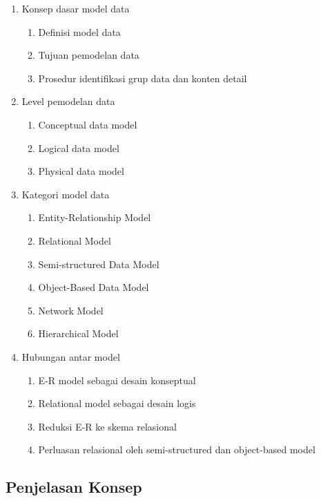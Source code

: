 \begin{enumerate}
    \item \pwajib Konsep dasar model data
    \begin{enumerate}
        \item \pwajib Definisi model data
        \item \pwajib Tujuan pemodelan data
        \item \pwajib Prosedur identifikasi grup data dan konten detail
    \end{enumerate}
    \item \pwajib Level pemodelan data
    \begin{enumerate}
        \item \pwajib Conceptual data model
        \item \pwajib Logical data model
        \item \pwajib Physical data model
    \end{enumerate}
    \item \pwajib Kategori model data
    \begin{enumerate}
        \item \pwajib Entity-Relationship Model
        \item \pwajib Relational Model
        \item \ppaham Semi-structured Data Model
        \item \ppaham Object-Based Data Model
        \item \ppaham Network Model
        \item \ppaham Hierarchical Model
    \end{enumerate}
    \item \pwajib Hubungan antar model
    \begin{enumerate}
        \item \pwajib E-R model sebagai desain konseptual
        \item \pwajib Relational model sebagai desain logis
        \item \pwajib Reduksi E-R ke skema relasional
        \item \ppaham Perluasan relasional oleh semi-structured dan object-based model
    \end{enumerate}
\end{enumerate}

\subsection{Penjelasan Konsep}


